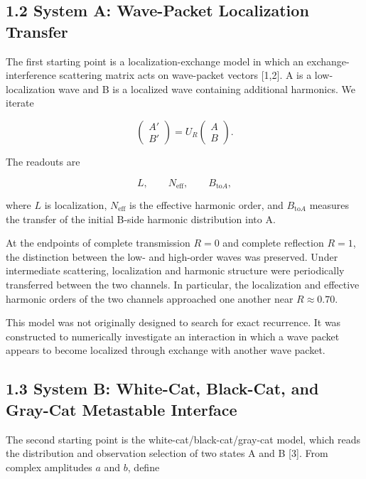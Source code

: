 \documentclass[
  10pt,
  a4paper,
]{article}
\begin{document}
\subsection{1.2 System A: Wave-Packet Localization
Transfer}\label{system-a-wave-packet-localization-transfer}

The first starting point is a localization-exchange model in which an
exchange-interference scattering matrix acts on wave-packet vectors
{[}1,2{]}. A is a low-localization wave and B is a localized wave
containing additional harmonics. We iterate

\[
\begin{pmatrix}
A'\\B'
\end{pmatrix}
=
U_R
\begin{pmatrix}
A\\B
\end{pmatrix}.
\]

The readouts are

\[
L,\qquad N_{\mathrm{eff}},\qquad B_{\mathrm{to}A},
\]

where \(L\) is localization, \(N_{\mathrm{eff}}\) is the effective
harmonic order, and \(B_{\mathrm{to}A}\) measures the transfer of the
initial B-side harmonic distribution into A.

At the endpoints of complete transmission \(R=0\) and complete
reflection \(R=1\), the distinction between the low- and high-order
waves was preserved. Under intermediate scattering, localization and
harmonic structure were periodically transferred between the two
channels. In particular, the localization and effective harmonic orders
of the two channels approached one another near \(R\approx0.70\).

This model was not originally designed to search for exact recurrence.
It was constructed to numerically investigate an interaction in which a
wave packet appears to become localized through exchange with another
wave packet.

\subsection{1.3 System B: White-Cat, Black-Cat, and Gray-Cat Metastable
Interface}\label{system-b-white-cat-black-cat-and-gray-cat-metastable-interface}

The second starting point is the white-cat/black-cat/gray-cat model,
which reads the distribution and observation selection of two states A
and B {[}3{]}. From complex amplitudes \(a\) and \(b\), define
\end{document}

